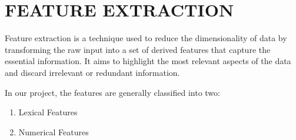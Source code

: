 \section{FEATURE EXTRACTION}
\par Feature extraction is a technique used to reduce the dimensionality of data by transforming the raw input into a set of derived features that capture the essential information. It aims to highlight the most relevant aspects of the data and discard irrelevant or redundant information. 
\par In our project, the features are generally classified into two:
\begin{enumerate}
  \item Lexical Features
  \item Numerical Features
\end{enumerate}
